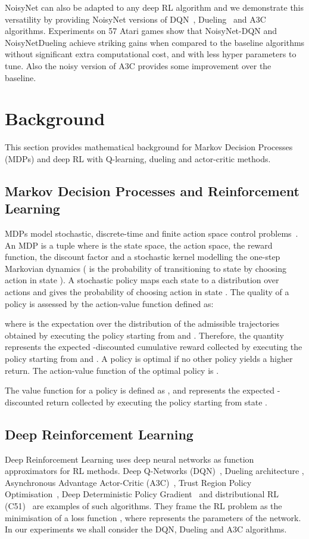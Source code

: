 \documentclass{article}
\newcommand{\algoinit}{NoisyNet}
\begin{document}
NoisyNet can also be adapted to any deep RL algorithm and we demonstrate this versatility by providing \algoinit{} versions of DQN~\citep{mnih2015human}, Dueling~\citep{wang2016Dueling} and A3C~\citep{mnih2016asynchronous} algorithms. Experiments on 57 Atari games show that NoisyNet-DQN and NoisyNetDueling achieve striking gains when compared to the baseline algorithms without significant extra computational cost, and with less hyper parameters to tune. Also the noisy version of A3C provides some improvement over the baseline.
\section{Background}
\label{sec:background}
This section provides mathematical background for Markov Decision Processes (MDPs) and deep RL with Q-learning, dueling and actor-critic methods.
\subsection{Markov Decision Processes and Reinforcement Learning}
MDPs model stochastic, discrete-time and finite action space control problems~\citep{bellman1965dynamic,bertsekas1995dynamic,puterman1994markov}.
An MDP is a tuple  where  is the state space,  the action space,  the reward function,  the discount factor and  a stochastic kernel modelling the one-step Markovian dynamics ( is the probability of transitioning to state  by choosing action  in state ). A stochastic policy  maps each state to a distribution over actions  and gives the probability  of choosing action  in state . The quality of a policy  is assessed by the action-value function  defined as:

where  is the expectation over the distribution of the admissible trajectories  obtained by executing the policy  starting from  and . Therefore, the quantity  represents the expected -discounted cumulative reward collected by executing the policy  starting from  and .
A policy is optimal if no other policy yields a higher return.
The action-value function of the optimal policy is .

The value function  for a policy is defined as , and represents the expected -discounted return collected by executing the policy  starting from state .
\subsection{Deep Reinforcement Learning}

Deep Reinforcement Learning uses deep neural networks as function approximators for RL methods. Deep Q-Networks (DQN)~\citep{mnih2015human}, Dueling architecture \citep{wang2016Dueling}, Asynchronous Advantage Actor-Critic (A3C)~\citep{mnih2016asynchronous}, Trust Region Policy Optimisation~\citep{schulman2015trust}, Deep Deterministic Policy Gradient~\citep{lillicrap2015continuous} and distributional RL (C51)~\citep{bellemare2017distributional} are examples of such algorithms. They frame the RL problem as the minimisation of a loss function , where  represents the parameters of the network. In our experiments we shall consider the DQN, Dueling and A3C algorithms. 
\end{document}
